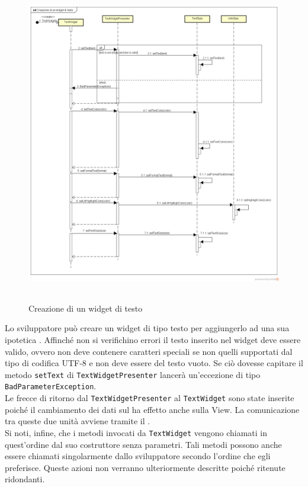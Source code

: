 \label{Creazione di un widget di testo}
\begin{figure}[H]
	\centering
	\includegraphics[width=16cm, height=14cm]{Sezioni/Diagrammi/img/Creazione di un widget di testo.png}
	\caption{Creazione di un widget di testo}
\end{figure}

Lo sviluppatore può creare un widget di tipo testo per aggiungerlo ad una sua ipotetica . Affinché non si verifichino errori il testo inserito nel widget deve essere valido, ovvero non deve contenere caratteri speciali se non quelli supportati dal tipo di codifica UTF-8 e non deve essere del testo vuoto. Se ciò dovesse capitare il metodo \texttt{setText} di \texttt{TextWidgetPresenter} lancerà un'eccezione di tipo \texttt{BadParameterException}. \\
Le frecce di ritorno dal \texttt{TextWidgetPresenter}  al \texttt{TextWidget} sono state inserite poiché il cambiamento dei dati sul  ha effetto anche sulla View. La comunicazione tra queste due unità avviene tramite il  . \\
Si noti, infine, che i metodi invocati da \texttt{TextWidget} vengono chiamati in quest'ordine dal suo costruttore senza parametri. Tali metodi possono anche essere chiamati singolarmente dallo sviluppatore secondo l'ordine che egli preferisce. Queste azioni non verranno ulteriormente descritte poiché ritenute ridondanti.

